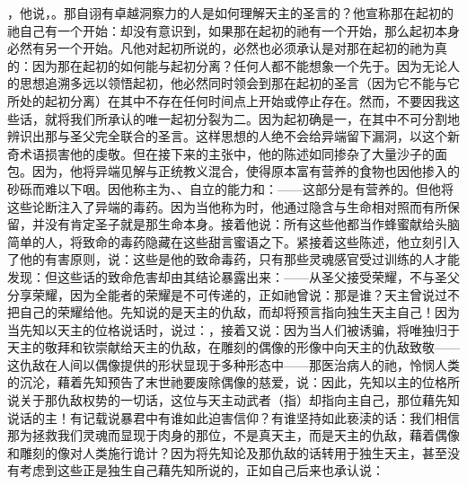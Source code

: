 ，他说，。那自诩有卓越洞察力的人是如何理解天主的圣言的？他宣称那在起初的祂自己有一个开始：却没有意识到，如果那在起初的祂有一个开始，那么起初本身必然有另一个开始。凡他对起初所说的，必然也必须承认是对那在起初的祂为真的：因为那在起初的如何能与起初分离？任何人都不能想象一个先于。因为无论人的思想追溯多远以领悟起初，他必然同时领会到那在起初的圣言（因为它不能与它所处的起初分离）在其中不存在任何时间点上开始或停止存在。然而，不要因我这些话，就将我们所承认的唯一起初分裂为二。因为起初确是一，在其中不可分割地辨识出那与圣父完全联合的圣言。这样思想的人绝不会给异端留下漏洞，以这个新奇术语损害他的虔敬。\newline{}\newline{}但在接下来的主张中，他的陈述如同掺杂了大量沙子的面包。因为，他将异端见解与正统教义混合，使得原本富有营养的食物也因他掺入的砂砾而难以下咽。因他称主为、、自立的能力和：——这部分是有营养的。但他将这些论断注入了异端的毒药。因为当他称为时，他通过隐含与生命相对照而有所保留，并没有肯定圣子就是那生命本身。接着他说：所有这些他都当作蜂蜜献给头脑简单的人，将致命的毒药隐藏在这些甜言蜜语之下。紧接着这些陈述，他立刻引入了他的有害原则，说：\newline{}\newline{}这些是他的致命毒药，只有那些灵魂感官受过训练的人才能发现：但这些话的致命危害却由其结论暴露出来：——从圣父接受荣耀，不与圣父分享荣耀，因为全能者的荣耀是不可传递的，正如祂曾说：\newline{}\newline{}那是谁？天主曾说过不把自己的荣耀给他。先知说的是天主的仇敌，而却将预言指向独生天主自己！因为当先知以天主的位格说话时，说过：，接着又说：因为当人们被诱骗，将唯独归于天主的敬拜和钦崇献给天主的仇敌，在雕刻的偶像的形像中向天主的仇敌致敬——这仇敌在人间以偶像提供的形状显现于多种形态中——那医治病人的祂，怜悯人类的沉沦，藉着先知预告了末世祂要废除偶像的慈爱，说：\newline{}\newline{}因此，先知以主的位格所说关于那仇敌权势的一切话，这位与天主动武者（指）却指向主自己，那位藉先知说话的主！有记载说暴君中有谁如此迫害信仰？有谁坚持如此亵渎的话：我们相信那为拯救我们灵魂而显现于肉身的那位，不是真天主，而是天主的仇敌，藉着偶像和雕刻的像对人类施行诡计？因为将先知论及那仇敌的话转用于独生天主，甚至没有考虑到这些正是独生自己藉先知所说的，正如自己后来也承认说：\par

